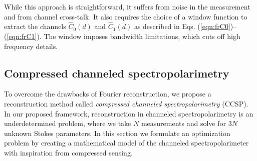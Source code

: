 \documentclass[10pt]{article}
\numberwithin{equation}{subsection}
\begin{document}
While this approach is straightforward, it suffers from noise in the measurement and from channel cross-talk.
It also requires the choice of a window function to extract the channels $\widehat{C}_0(d)$ and $\widehat{C}_1(d)$ as described in Eqs. (\ref{eqn:frC0})--(\ref{eqn:frC1}).
The window imposes bandwidth limitations, which cuts off high frequency details.

\subsection{Compressed channeled spectropolarimetry}\label{sectionCS}

To overcome the drawbacks of Fourier reconstruction, we propose a reconstruction method called \emph{compressed channeled spectropolarimetry} (CCSP).
    In our proposed framework, reconstruction in channeled spectropolarimetry is an underdetermined problem, where we take $N$ measurements and solve for $3 N$ unknown Stokes parameters.
    In this section we formulate an optimization problem by creating a mathematical model of the channeled spectropolarimeter with inspiration from compressed sensing.
\end{document}
